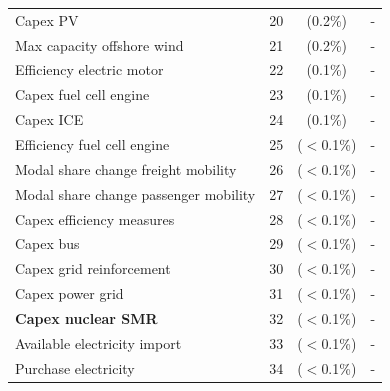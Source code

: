 \documentclass[11pt,twoside,a4paper,english]{article}
\begin{document}
\begin{appendices}
\begin{table}[htbp]
\begin{tabular}{l c c| c c}
Capex PV & 20 & (0.2\%) & \multicolumn{2}{c}{-} \\
Max capacity offshore wind & 21 & (0.2\%) & \multicolumn{2}{c}{-} \\
Efficiency electric motor & 22 & (0.1\%) & \multicolumn{2}{c}{-} \\
Capex fuel cell engine & 23 & (0.1\%) & \multicolumn{2}{c}{-} \\
Capex ICE & 24 & (0.1\%) & \multicolumn{2}{c}{-} \\
Efficiency fuel cell engine & 25 & ($<$0.1\%) & \multicolumn{2}{c}{-} \\
Modal share change freight mobility & 26 & ($<$0.1\%) & \multicolumn{2}{c}{-} \\
Modal share change passenger mobility & 27 & ($<$0.1\%) & \multicolumn{2}{c}{-} \\
Capex efficiency measures & 28 & ($<$0.1\%) & \multicolumn{2}{c}{-} \\
Capex bus & 29 & ($<$0.1\%) & \multicolumn{2}{c}{-} \\
Capex grid reinforcement & 30 & ($<$0.1\%) & \multicolumn{2}{c}{-} \\
Capex power grid & 31 & ($<$0.1\%) & \multicolumn{2}{c}{-} \\
\textbf{Capex nuclear SMR} & 32 & ($<$0.1\%) & \multicolumn{2}{c}{-} \\
Available electricity import & 33 & ($<$0.1\%) & \multicolumn{2}{c}{-} \\
Purchase electricity & 34 & ($<$0.1\%) & \multicolumn{2}{c}{-} \\
\bottomrule							

\end{tabular}
\end{table}


\end{appendices}
\end{document}
